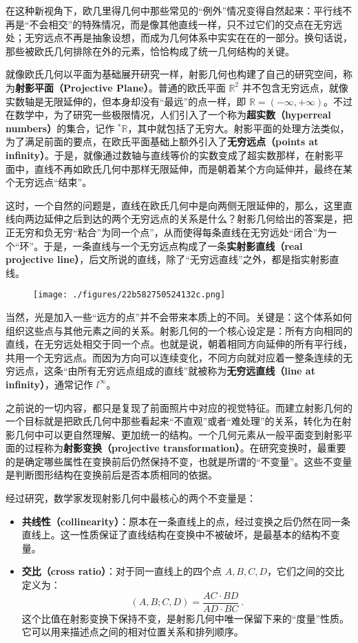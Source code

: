 在这种新视角下，欧几里得几何中那些常见的“例外”情况变得自然起来：平行线不再是“不会相交”的特殊情况，而是像其他直线一样，只不过它们的交点在无穷远处；无穷远点不再是抽象设想，而成为几何体系中实实在在的一部分。换句话说，那些被欧氏几何排除在外的元素，恰恰构成了统一几何结构的关键。

就像欧氏几何以平面为基础展开研究一样，射影几何也构建了自己的研究空间，称为\textbf{射影平面（Projective Plane）}。普通的欧氏平面 $\mathbb{R}^2$ 并不包含无穷远点，就像实数轴是无限延伸的，但本身却没有“最远”的点一样，即 $\mathbb{R} = (-\infty, +\infty)$。不过在数学中，为了研究一些极限情况，人们引入了一个称为\textbf{超实数（hyperreal numbers）}的集合，记作 $^*\mathbb{R}$，其中就包括了无穷大。射影平面的处理方法类似，为了满足前面的要点，在欧氏平面基础上额外引入了\textbf{无穷远点（points at infinity）}。于是，就像通过数轴与直线等价的实数变成了超实数那样，在射影平面中，直线不再如欧氏几何中那样无限延伸，而是朝着某个方向延伸并，最终在某个无穷远点“结束”。

这时，一个自然的问题是，直线在欧氏几何中是向两侧无限延伸的，那么，这里直线向两边延伸之后到达的两个无穷远点的关系是什么？射影几何给出的答案是，把正无穷和负无穷“粘合”为同一个点”，从而使得每条直线在无穷远处“闭合”为一个“环”。于是，一条直线与一个无穷远点构成了一条\textbf{实射影直线（real projective line）}，后文所说的直线，除了“无穷远直线”之外，都是指实射影直线。
\begin{figure}[ht]
\centering
\texttt{[image: ./figures/22b582750524132c.png]}
\caption{} \label{fig_HsPGCC_1}
\end{figure}
当然，光是加入一些“远方的点”并不会带来本质上的不同。关键是：这个体系如何组织这些点与其他元素之间的关系。射影几何的一个核心设定是：所有方向相同的直线，在无穷远处相交于同一个点。也就是说，朝着相同方向延伸的所有平行线，共用一个无穷远点。而因为方向可以连续变化，不同方向就对应着一整条连续的无穷远点，这条“由所有无穷远点组成的直线”就被称为\textbf{无穷远直线（line at infinity）}，通常记作 $l^\infty$。

之前说的一切内容，都只是复现了前面照片中对应的视觉特征。而建立射影几何的一个目标就是把欧氏几何中那些看起来“不直观”或者“难处理”的关系，转化为在射影几何中可以更自然理解、更加统一的结构。一个几何元素从一般平面变到射影平面的过程称为\textbf{射影变换（projective transformation）}。在研究变换时，最重要的是确定哪些属性在变换前后仍然保持不变，也就是所谓的“不变量”。这些不变量是判断图形结构在变换前后是否本质相同的依据。

经过研究，数学家发现射影几何中最核心的两个不变量是：
\begin{itemize}
\item \textbf{共线性（collinearity）}：原本在一条直线上的点，经过变换之后仍然在同一条直线上。这一性质保证了直线结构在变换中不被破坏，是最基本的结构不变量。
\item \textbf{交比（cross ratio）}：对于同一直线上的四个点 $A, B, C, D$，它们之间的交比定义为：
\begin{equation}
(A, B; C, D) = \frac{AC \cdot BD}{AD \cdot BC}~.
\end{equation}
这个比值在射影变换下保持不变，是射影几何中唯一保留下来的“度量”性质。它可以用来描述点之间的相对位置关系和排列顺序。
\end{itemize}

